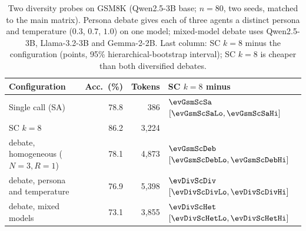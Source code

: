 \begin{table}[ht]\centering\small
\caption{Two diversity probes on GSM8K (Qwen2.5-3B base; $n{=}80$, two seeds,
matched to the main matrix). Persona debate gives each of three agents a distinct
persona and temperature ($0.3$, $0.7$, $1.0$) on one model; mixed-model debate
uses Qwen2.5-3B, Llama-3.2-3B and Gemma-2-2B. Last column: SC $k{=}8$ minus the
configuration (points, 95\% hierarchical-bootstrap interval); SC $k{=}8$ is cheaper
than both diversified debates.}
\label{tab:diversity}
\begin{tabular}{lrrl}
\toprule
Configuration & Acc.\ (\%) & Tokens & SC $k{=}8$ minus \\
\midrule
Single call (SA) & 78.8 & 386 & $\evGsmScSa$ $[\evGsmScSaLo,\evGsmScSaHi]$ \\
SC $k{=}8$ & 86.2 & 3{,}224 & \\
debate, homogeneous ($N{=}3,R{=}1$) & 78.1 & 4{,}873 & $\evGsmScDeb$ $[\evGsmScDebLo,\evGsmScDebHi]$ \\
debate, persona and temperature & 76.9 & 5{,}398 & $\evDivScDiv$ $[\evDivScDivLo,\evDivScDivHi]$ \\
debate, mixed models & 73.1 & 3{,}855 & $\evDivScHet$ $[\evDivScHetLo,\evDivScHetHi]$ \\
\bottomrule
\end{tabular}
\end{table}
